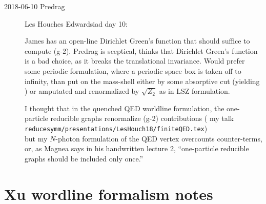 \begin{description}
\item[2018-06-10 Predrag] Les Houches Edwardsiad day 10:

James has an open-line Dirichlet Green's function that should suffice
to compute (g-2). Predrag is sceptical, thinks that Dirichlet Green's function
is a bad choice, as it breaks the translational invariance. Would prefer
some periodic formulation, where a periodic space box is taken off to
infinity, than put on the mass-shell either by some absorptive cut
(yielding ) or amputated and renormalized by
$\sqrt{Z_2}$ as in LSZ formulation.

I thought that in the quenched QED worldline formulation, the
one-particle reducible graphs renormalize (g-2) contributions
( {my talk}\\
\texttt{reducesymm/presentations/LesHouch18/finiteQED.tex}) \\
but my $N$-photon formulation of the QED vertex overcounts counter-terms,
or, as Magnea says in his handwritten
 {lecture 2},
``one-particle reducible graphs should be included only once.''


\end{description}


\section{Xu wordline formalism notes}
\label{c-dailyBlogGX}

